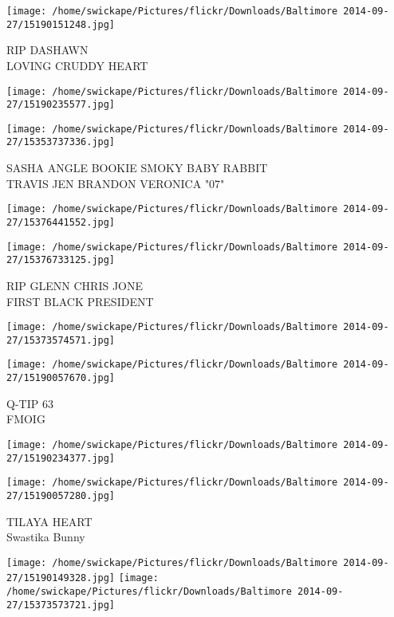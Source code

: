 \documentclass[10pt,letterpaper]{article}
\begin{document}
\vspace{0.25in}
\texttt{[image: /home/swickape/Pictures/flickr/Downloads/Baltimore 2014-09-27/15190151248.jpg]}

RIP DASHAWN\\
LOVING CRUDDY HEART
\pagebreak

\texttt{[image: /home/swickape/Pictures/flickr/Downloads/Baltimore 2014-09-27/15190235577.jpg]}

\vspace{0.25in}
\texttt{[image: /home/swickape/Pictures/flickr/Downloads/Baltimore 2014-09-27/15353737336.jpg]}

SASHA ANGLE BOOKIE SMOKY BABY RABBIT\\
TRAVIS JEN BRANDON VERONICA "07"
\pagebreak

\texttt{[image: /home/swickape/Pictures/flickr/Downloads/Baltimore 2014-09-27/15376441552.jpg]}

\vspace{0.25in}
\texttt{[image: /home/swickape/Pictures/flickr/Downloads/Baltimore 2014-09-27/15376733125.jpg]}

RIP GLENN CHRIS JONE\\
FIRST BLACK PRESIDENT
\pagebreak

\texttt{[image: /home/swickape/Pictures/flickr/Downloads/Baltimore 2014-09-27/15373574571.jpg]}

\vspace{0.25in}
\texttt{[image: /home/swickape/Pictures/flickr/Downloads/Baltimore 2014-09-27/15190057670.jpg]}

Q{-}TIP 63\\
FMOIG
\pagebreak

\texttt{[image: /home/swickape/Pictures/flickr/Downloads/Baltimore 2014-09-27/15190234377.jpg]}

\vspace{0.25in}
\texttt{[image: /home/swickape/Pictures/flickr/Downloads/Baltimore 2014-09-27/15190057280.jpg]}

TILAYA HEART\\
Swastika Bunny
\pagebreak

\texttt{[image: /home/swickape/Pictures/flickr/Downloads/Baltimore 2014-09-27/15190149328.jpg]}
\texttt{[image: /home/swickape/Pictures/flickr/Downloads/Baltimore 2014-09-27/15373573721.jpg]}
\end{document}
